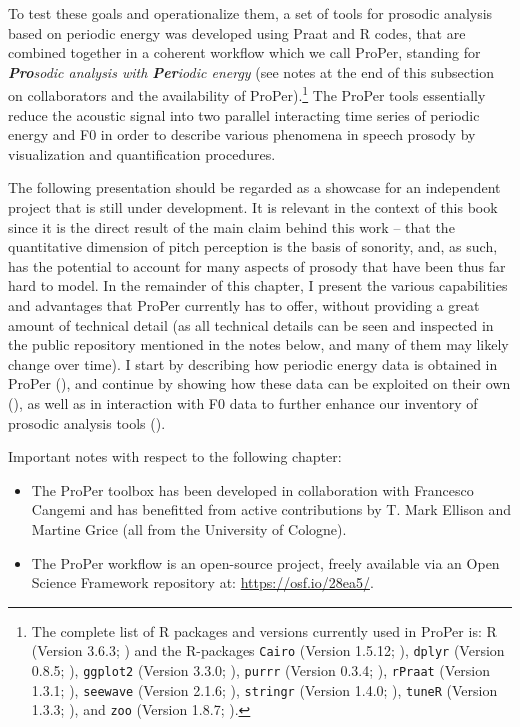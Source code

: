 To test these goals and operationalize them, a set of tools for prosodic analysis based on periodic energy was developed using Praat \citep{boersma2019praat} and R \citep{R-base} codes, that are combined together in a coherent workflow which we call ProPer, standing for \emph{\textbf{Pro}sodic analysis with \textbf{Per}iodic energy}
(see notes at the end of this subsection on collaborators and the availability of ProPer).\footnote{The complete list of R packages and versions currently used in ProPer is: R (Version 3.6.3; \citealt{R-base}) and the R-packages \texttt{Cairo} (Version 1.5.12; \citealt{R-Cairo}), \texttt{dplyr} (Version 0.8.5; \citealt{R-dplyr}), \texttt{ggplot2} (Version 3.3.0; \citealt{ggplot22016}), \texttt{purrr} (Version 0.3.4; \citealt{R-purrr}), \texttt{rPraat} (Version 1.3.1; \citealt{R-rPraat}), \texttt{seewave} (Version 2.1.6; \citealt{R-seewave}), \texttt{stringr} (Version 1.4.0; \citealt{R-stringr}), \texttt{tuneR} (Version 1.3.3; \citealt{tuneR2018}), and \texttt{zoo} (Version 1.8.7; \citealt{R-zoo}).}
The ProPer tools essentially reduce the acoustic signal into two parallel interacting time series of periodic energy and F0 in order to describe various phenomena in speech prosody by visualization and quantification procedures.

The following presentation should be regarded as a showcase for an independent project that is still under development. It is relevant in the context of this book since it is the direct result of the main claim behind this work -- that the quantitative dimension of pitch perception is the basis of sonority, and, as such, has the potential to account for many aspects of prosody that have been thus far hard to model.
In the remainder of this chapter, I present the various capabilities and advantages that ProPer currently has to offer, without providing a great amount of technical detail (as all technical details can be seen and inspected in the public repository mentioned in the notes below, and many of them may likely change over time). I start by describing how periodic energy data is obtained in ProPer (), and continue by showing how these data can be exploited on their own (), as well as in interaction with F0 data to further enhance our inventory of prosodic analysis tools ().

Important notes with respect to the following chapter:

\begin{itemize}
\item The ProPer toolbox has been developed in collaboration with Francesco Cangemi and has benefitted from active contributions by T. Mark Ellison and Martine Grice (all from the University of Cologne).
\item The ProPer workflow is an open-source project, freely available via an Open Science Framework repository at: \url{https://osf.io/28ea5/}.
\end{itemize}

